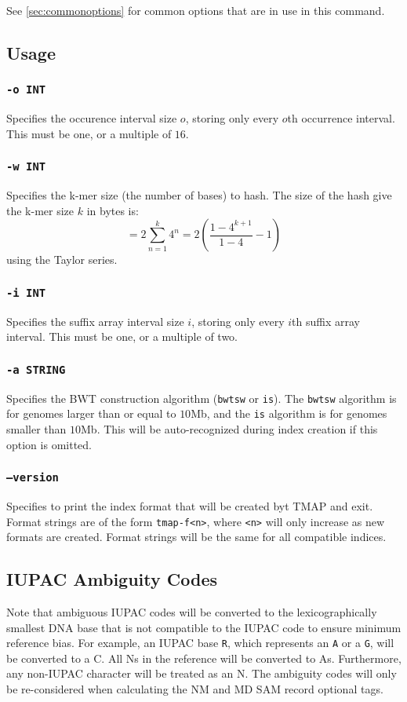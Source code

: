 \documentclass[a4paper,12pt]{book}
\newcommand{\TT}[1]{{\tt #1}} %
\begin{document}
See \autoref{sec:commonoptions} for common options that are in use in this command.

\subsection{Usage}

\subsubsection{\TT{-o INT}}
Specifies the occurence interval size $o$, storing only every $o$th occurrence interval.
This must be one, or a multiple of $16$.

\subsubsection{\TT{-w INT}}
Specifies the k-mer size (the number of bases) to hash.
The size of the hash give the k-mer size $k$ in bytes is:
\[
= 2 \sum_{n=1}^{k} 4^{n}
= 2 \left(\frac{1 - 4^{k+1}}{1-4} - 1\right)
\]
using the Taylor series.

\subsubsection{\TT{-i INT}}
Specifies the suffix array interval size $i$, storing only every $i$th suffix array interval.
This must be one, or a multiple of two.

\subsubsection{\TT{-a STRING}}
Specifies the BWT construction algorithm (\TT{bwtsw} or \TT{is}).
The \TT{bwtsw} algorithm is for genomes larger than or equal to $10$Mb, and the \TT{is} algorithm is for genomes smaller than $10$Mb.
This will be auto-recognized during index creation if this option is omitted.

\subsubsection{\TT{--version}}
Specifies to print the index format that will be created byt TMAP and exit.
Format strings are of the form \TT{tmap-f<n>}, where \TT{<n>} will only increase as new formats are created.
Format strings will be the same for all compatible indices.
\subsection{IUPAC Ambiguity Codes}
Note that ambiguous IUPAC codes will be converted to the lexicographically smallest DNA base that is not compatible to the IUPAC code to ensure minimum reference bias.
For example, an IUPAC base \TT{R}, which represents an \TT{A} or a \TT{G}, will be converted to a C.
All Ns in the reference will be converted to As.
Furthermore, any non-IUPAC character will be treated as an N.
The ambiguity codes will only be re-considered when calculating the NM and MD SAM record optional tags.
\end{document}
